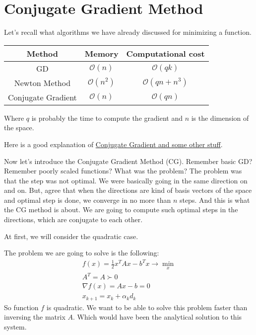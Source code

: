 \section{Conjugate Gradient Method}

Let's recall what algorithms we have already discussed for minimizing a function. 

\begin{table}[!ht]
    \centering
    \begin{tabular}{c c c}
        \toprule
        \textbf{Method} & \textbf{Memory} & \textbf{Computational cost} \\
        \midrule
        GD & $\mathcal{O}(n)$ & $\mathcal{O}(qk)$ \\
        \midrule
        Newton Method & $\mathcal{O}(n^2)$ & $\mathcal{O}(qn + n^3)$ \\
        \midrule
        Conjugate Gradient & $\mathcal{O}(n)$ & $\mathcal{O}(qn)$ \\
        \bottomrule
    \end{tabular}
\end{table}

Where $q$ is probably the time to compute the gradient and $n$ is the dimension of the space.

Here is a good explanation of \href{https://www.cs.cmu.edu/~quake-papers/painless-conjugate-gradient.pdf}{Conjugate Gradient and some other stuff}.

Now let's introduce the Conjugate Gradient Method (CG). Remember basic GD\@? Remember poorly scaled functions? What was the problem? The problem was that the step was not optimal. We were basically going in the same direction on and on. But, agree that when the directions are kind of basis vectors of the space and optimal step is done, we converge in no more than $n$ steps. And this is what the CG method is about. We are going to compute such optimal steps in the directions, which are conjugate to each other. 

At first, we will consider the quadratic case.

The problem we are going to solve is the following:
\begin{gather*}
    f(x) = \frac{1}{2} x^T A x - b^T x \to \min_x \\ A^T = A \succ 0 \\ 
    \nabla f(x) = Ax - b = 0 \\ 
    x_{k+1} = x_k + \alpha_k d_k
\end{gather*}
So function $f$ is quadratic. We want to be able to solve this problem faster than inversing the matrix $A$. Which would have been the analytical solution to this system.

